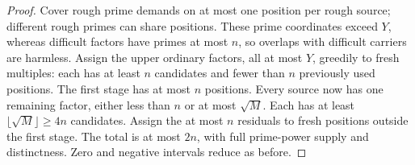 \documentclass[11pt,a4paper]{article}
\begin{document}
\begin{proof}
Cover rough prime demands on at most one position per rough source;
different rough primes can share positions. These prime coordinates
exceed $Y$, whereas difficult factors have primes at most $n$,
so overlaps with difficult carriers are harmless.
Assign the upper ordinary factors, all at most $Y$, greedily to fresh
multiples: each has at least $n$ candidates and fewer than $n$ previously
used positions. The first stage has at most $n$ positions.
Every source now has one remaining factor, either less than $n$ or
at most $\sqrt M$. Each has at least $\lfloor\sqrt M\rfloor\ge4n$
candidates. Assign the at most $n$ residuals to fresh positions outside
the first stage. The total is at most $2n$, with full prime-power
supply and distinctness. Zero and negative intervals reduce as before.
\end{proof}
\end{document}
